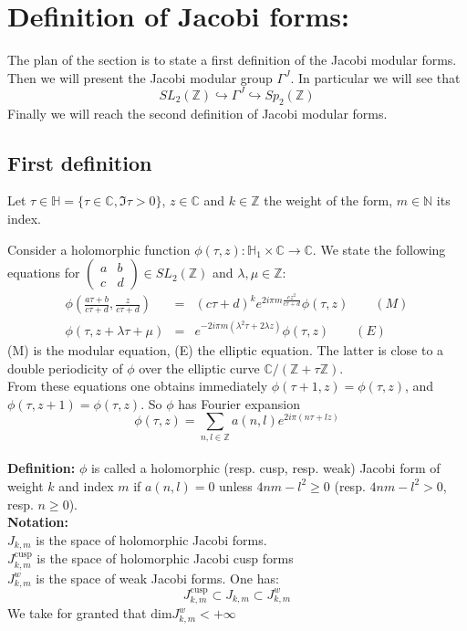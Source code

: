 \documentclass[10pt,a4paper]{article}
\begin{document}
\section{Definition of Jacobi forms:}
The plan of the section is to state a first definition of the Jacobi modular forms. Then we will present the Jacobi modular group $\Gamma^J$. In particular we will see that 
\[SL_2(\mathbb{Z})\hookrightarrow\Gamma^J\hookrightarrow Sp_2(\mathbb{Z})\]
 Finally we will reach the second definition of Jacobi modular forms.

\subsection{First definition}
Let $\tau\in\mathbb{H}=\{\tau\in\mathbb{C},\Im\tau>0\}$, $z\in\mathbb{C}$ and $k\in\mathbb{Z}$ the weight of the form, $ m\in\mathbb{N}$ its index.

Consider a holomorphic function $\phi(\tau,z):\mathbb{H}_1\times\mathbb{C}\rightarrow\mathbb{C}$. 
We state the following equations for $\left(\begin{array}{cc} a & b \\ c & d \end{array}\right)\in SL_2(\mathbb{Z})$ and $\lambda,\mu\in\mathbb{Z}$:
\begin{eqnarray*}
\phi\left(\frac{a\tau+b}{c\tau+d},\frac{z}{c\tau+d}\right)&=&(c\tau+d)^ke^{2i\pi m\frac{cz^2}{c\tau+d}}\phi(\tau,z)\qquad(M)\\
\phi(\tau,z+\lambda\tau+\mu)&=&e^{-2i\pi m(\lambda^2\tau+2\lambda z)}\phi(\tau,z)\qquad (E)
\end{eqnarray*}
(M) is the modular equation, (E) the elliptic equation. The latter is close to a double periodicity of $\phi$ over the elliptic curve $\mathbb{C}/(\mathbb{Z}+\tau\mathbb{Z})$.\\
From these equations one obtains immediately $\phi(\tau+1,z)=\phi(\tau,z)$, and \\
$\phi(\tau,z+1)=\phi(\tau,z)$. So $\phi$ has Fourier expansion \[\phi(\tau,z)=\sum_{n,l\in\mathbb{Z}}a(n,l)e^{2i\pi(n\tau+lz)}\]
\\
\textbf{Definition: } $\phi$ is called a holomorphic (resp. cusp, resp. weak) Jacobi form of weight $k$ and index $m$ if $a(n,l)=0$ unless $4nm-l^2\geq0$ (resp. $4nm-l^2>0$, resp. $n\geq0$).\\
\textbf{Notation:}\\
 $J_{k,m}$ is the space of holomorphic Jacobi forms.\\
 $J_{k,m}^{\textrm{cusp}}$ is the space of holomorphic Jacobi cusp forms\\
$J_{k,m}^w$ is the space of weak Jacobi forms. One has:
\[J_{k,m}^{\textrm{cusp}}\subset J_{k,m}\subset J_{k,m}^w\]
We take for granted that $\textrm{dim}J_{k,m}^w<+\infty$\\
\end{document}
